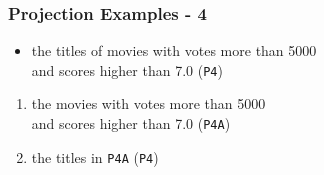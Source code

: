 \documentclass[dvipsnames]{beamer}
\theoremstyle{plain}
\begin{document}
\begin{frame}
  \frametitle{Projection Examples - 4}

  \begin{example}
    \begin{itemize}
      \item the titles of movies with votes more than 5000\\
        and scores higher than 7.0 (\texttt{P4})
    \end{itemize}

    \pause
    \begin{enumerate}
      \item the movies with votes more than 5000\\
        and scores higher than 7.0 (\texttt{P4A})

      \pause
      \item the titles in \texttt{P4A} (\texttt{P4})
    \end{enumerate}
  \end{example}
\end{frame}
\end{document}
